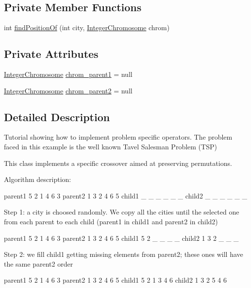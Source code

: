 \subsection*{Private Member Functions}
\begin{DoxyCompactItemize}
\item 
int \hyperlink{classjenes_1_1tutorials_1_1old_1_1problem3_1_1_t_s_p_city_centered_crossover_a98e8b78d1a64a8d319d4df7c706ca620}{find\-Position\-Of} (int city, \hyperlink{classjenes_1_1chromosome_1_1_integer_chromosome}{Integer\-Chromosome} chrom)
\end{DoxyCompactItemize}
\subsection*{Private Attributes}
\begin{DoxyCompactItemize}
\item 
\hyperlink{classjenes_1_1chromosome_1_1_integer_chromosome}{Integer\-Chromosome} \hyperlink{classjenes_1_1tutorials_1_1old_1_1problem3_1_1_t_s_p_city_centered_crossover_a6db3f90dcd7168296f0bf2e302f23b01}{chrom\-\_\-parent1} = null
\item 
\hyperlink{classjenes_1_1chromosome_1_1_integer_chromosome}{Integer\-Chromosome} \hyperlink{classjenes_1_1tutorials_1_1old_1_1problem3_1_1_t_s_p_city_centered_crossover_ac6a6ab508405250bfacf8691052237e7}{chrom\-\_\-parent2} = null
\end{DoxyCompactItemize}


\subsection{Detailed Description}
Tutorial showing how to implement problem specific operators. The problem faced in this example is the well known Tavel Salesman Problem (T\-S\-P)

This class implements a specific crossover aimed at preserving permutations.

Algorithm description\-: 
\begin{DoxyPre}
      parent1  5 2 1 4 6 3     parent2   1 3 2 4 6 5
      child1   \_ \_ \_ \_ \_ \_     child2    \_ \_ \_ \_ \_ \_
\end{DoxyPre}
 Step 1\-: a city is choosed randomly. We copy all the cities until the selected one from each parent to each child (parent1 in child1 and parent2 in child2) 
\begin{DoxyPre}
      parent1  5 2 1 4 6 3     parent2   1 3 2 4 6 5
      child1   5 2 \_ \_ \_ \_     child2    1 3 2 \_ \_ \_
 \end{DoxyPre}
 Step 2\-: we fill child1 getting missing elements from parent2; these ones will have the same parent2 order 
\begin{DoxyPre}
      parent1  5 2 1 4 6 3     parent2  1 3 2 4 6 5
      child1   5 2 1 3 4 6     child2   1 3 2 5 4 6
\end{DoxyPre}


